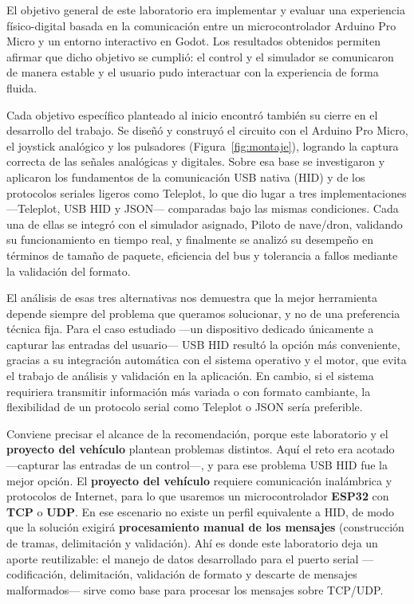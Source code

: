 \documentclass[journal]{IEEEtran}
\begin{document}
El objetivo general de este laboratorio era implementar y evaluar una experiencia físico-digital basada en la comunicación entre un microcontrolador Arduino Pro Micro y un entorno interactivo en Godot. Los resultados obtenidos permiten afirmar que dicho objetivo se cumplió: el control y el simulador se comunicaron de manera estable y el usuario pudo interactuar con la experiencia de forma fluida.

Cada objetivo específico planteado al inicio encontró también su cierre en el desarrollo del trabajo. Se diseñó y construyó el circuito con el Arduino Pro Micro, el joystick analógico y los pulsadores (Figura~\ref{fig:montaje}), logrando la captura correcta de las señales analógicas y digitales. Sobre esa base se investigaron y aplicaron los fundamentos de la comunicación USB nativa (HID) y de los protocolos seriales ligeros como Teleplot, lo que dio lugar a tres implementaciones ---Teleplot, USB HID y JSON--- comparadas bajo las mismas condiciones. Cada una de ellas se integró con el simulador asignado, Piloto de nave/dron, validando su funcionamiento en tiempo real, y finalmente se analizó su desempeño en términos de tamaño de paquete, eficiencia del bus y tolerancia a fallos mediante la validación del formato.

El análisis de esas tres alternativas nos demuestra que la mejor herramienta depende siempre del problema que queramos solucionar, y no de una preferencia técnica fija. Para el caso estudiado ---un dispositivo dedicado únicamente a capturar las entradas del usuario--- USB HID resultó la opción más conveniente, gracias a su integración automática con el sistema operativo y el motor, que evita el trabajo de análisis y validación en la aplicación. En cambio, si el sistema requiriera transmitir información más variada o con formato cambiante, la flexibilidad de un protocolo serial como Teleplot o JSON sería preferible.

Conviene precisar el alcance de la recomendación, porque este laboratorio y el \textbf{proyecto del vehículo} plantean problemas distintos. Aquí el reto era acotado ---capturar las entradas de un control---, y para ese problema USB HID fue la mejor opción. El \textbf{proyecto del vehículo} requiere comunicación inalámbrica y protocolos de Internet, para lo que usaremos un microcontrolador \textbf{ESP32} con \textbf{TCP} o \textbf{UDP}. En ese escenario no existe un perfil equivalente a HID, de modo que la solución exigirá \textbf{procesamiento manual de los mensajes} (construcción de tramas, delimitación y validación). Ahí es donde este laboratorio deja un aporte reutilizable: el manejo de datos desarrollado para el puerto serial ---codificación, delimitación, validación de formato y descarte de mensajes malformados--- sirve como base para procesar los mensajes sobre TCP/UDP.
\end{document}
